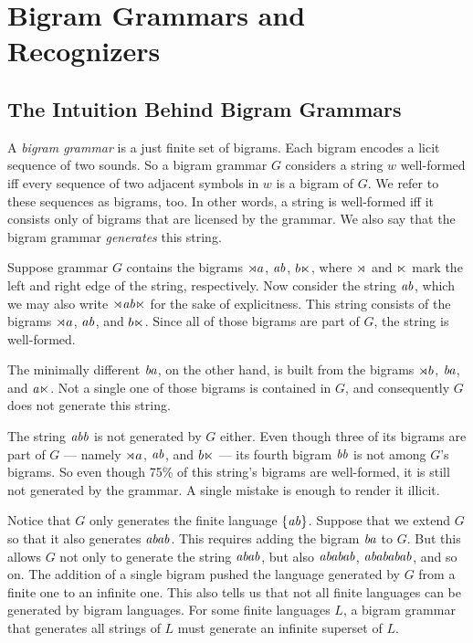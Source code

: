 \section{Bigram Grammars and Recognizers}

\subsection{The Intuition Behind Bigram Grammars}
A \emph{bigram grammar} is a just finite set of bigrams.
Each bigram encodes a licit sequence of two sounds.
So a bigram grammar $G$ considers a string $w$ well-formed iff every sequence of two adjacent symbols in $w$ is a bigram of $G$.
We refer to these sequences as bigrams, too.
In other words, a string is well-formed iff it consists only of bigrams that are licensed by the grammar.
We also say that the bigram grammar \emph{generates} this string.

\begin{examplebox}
    \label{ex:SL_BigramGrammar}%
    Suppose grammar $G$ contains the bigrams $\rtimes a$, $\mathit{ab}$, $b \ltimes$, where $\rtimes$ and $\ltimes$ mark the left and right edge of the string, respectively.
    Now consider the string $\mathit{ab}$, which we may also write $\rtimes \mathit{ab} \ltimes$ for the sake of explicitness.
    This string consists of the bigrams $\rtimes a$, $\mathit{ab}$, and $b \ltimes$.
    Since all of those bigrams are part of $G$, the string is well-formed. 

    The minimally different $\mathit{ba}$, on the other hand, is built from the bigrams $\rtimes b$, $\mathit{ba}$, and $\mathit{a \ltimes}$.
    Not a single one of those bigrams is contained in $G$, and consequently $G$ does not generate this string.

    The string $\mathit{abb}$ is not generated by $G$ either.
    Even though three of its bigrams are part of $G$ --- namely $\rtimes a$, $\mathit{ab}$, and $b \ltimes$ --- its fourth bigram $\mathit{bb}$ is not among $G$'s bigrams.
    So even though 75\% of this string's bigrams are well-formed, it is still not generated by the grammar.
    A single mistake is enough to render it illicit.

    Notice that $G$ only generates the finite language $\left \{ \mathit{ab} \right \}$.
    Suppose that we extend $G$ so that it also generates $\mathit{abab}$.
    This requires adding the bigram $\mathit{ba}$ to $G$.
    But this allows $G$ not only to generate the string $\mathit{abab}$, but also $\mathit{ababab}$, $\mathit{abababab}$, and so on.
    The addition of a single bigram pushed the language generated by $G$ from a finite one to an infinite one.
    This also tells us that not all finite languages can be generated by bigram languages.
    For some finite languages $L$, a bigram grammar that generates all strings of $L$ must generate an infinite superset of $L$.
\end{examplebox}

